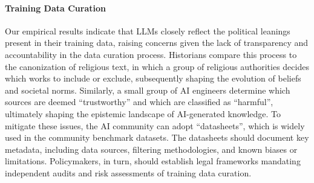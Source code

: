 \paragraph{Training Data Curation}
Our empirical results indicate that LLMs closely reflect the political leanings present in their training data, raising concerns given the lack of transparency and accountability in the data curation process. Historians \cite{harari2024nexus} compare this process to the canonization of religious text, in which a group of religious authorities decides which works to include or exclude, subsequently shaping the evolution of beliefs and societal norms. Similarly, a small group of AI engineers determine which sources are deemed ``trustworthy'' and which are classified as ``harmful'', 
ultimately shaping the epistemic landscape of AI-generated knowledge.
To mitigate these issues, 
the AI community can adopt ``datasheets''\cite{gebru2021datasheets}, which is widely used in the community benchmark datasets. The datasheets should document key metadata, including data sources, filtering methodologies, and known biases or limitations. Policymakers, in turn, should establish legal frameworks mandating independent audits and risk assessments of training data curation.

